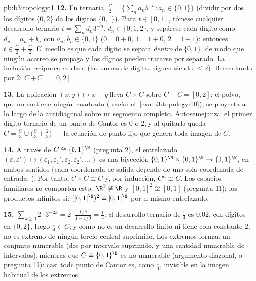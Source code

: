 \begin{solution}{pb:b3:topology:1}
\textbf{12.} En  ternaria, $\frac C2 = \{\sum_na_n3^{-n} : a_n
\in \{0, 1\}\}$ (dividir por dos los dígitos $\{0,2\}$ da los dígitos
$\{0,1\}$). Para $t \in [0,1]$, tómese cualquier desarrollo ternario
$t =
\sum_nd_n3^{-n}$, $d_n \in \{0,1,2\}$, y sepárese cada dígito como
$d_n = a_n + b_n$ con $a_n, b_n \in \{0,1\}$ ($0 = 0{+}0$, $1 = 1{+}0$,
$2 = 1{+}1$): entonces $t \in \frac C2 + \frac C2$. El meollo es que
cada dígito se separa \emph{dentro} de $\{0,1\}$, de modo que ningún
acarreo se propaga y los dígitos pueden tratarse por separado. La
inclusión recíproca es clara (las sumas de dígitos siguen siendo
$\leq 2$). Reescalando por $2$: $C + C = [0,2]$.

\textbf{13.} La aplicación $(x, y) \mapsto x + y$ lleva $C \times C$
sobre $C + C = [0,2]$: el polvo, que no contiene ningún cuadrado
( vacío:
el~\cref{exo:b3:topology:10}), se proyecta a lo largo de la antidiagonal
sobre un segmento completo. Autosemejanza: el primer dígito ternario de
un punto de Cantor es $0$ o $2$, y al quitarlo queda
$C = \frac C3 \cup \bigl(\frac C3 +
\frac23\bigr)$ --- la ecuación de punto fijo que genera toda imagen de
$C$.

\textbf{14.} A través de $C \cong \{0,1\}^\N$ (pregunta 2), el
entrelazado $(\varepsilon, \varepsilon') \mapsto
(\varepsilon_1, \varepsilon_1', \varepsilon_2,
\varepsilon_2', \dots)$ es una biyección
$\{0,1\}^\N\times\{0,1\}^\N \to \{0,1\}^\N$,
 en ambos sentidos (cada
coordenada de salida depende de una sola coordenada de entrada;
). Por tanto,
$C\times C \cong C$ y, por inducción, $C^n \cong C$. Los espacios
familiares no comparten esto: $\R^2 \not\cong \R$ y
$[0,1]^2 \not\cong [0,1]$ (pregunta 11); los productos infinitos sí:
$([0,1]^\N)^2 \cong
[0,1]^\N$ por el mismo entrelazado.

\textbf{15.} $\sum_{k\geq1}2\cdot3^{-2k} = 2\cdot\frac{1/9}{1
- 1/9} = \frac14$: el desarrollo ternario de $\frac14$ es
$0.\overline{02}$, con dígitos en $\{0,2\}$, luego $\frac14 \in
C$; y como no es un desarrollo finito ni tiene cola constante $2$, no es
extremo de ningún tercio central suprimido. Los extremos forman un
conjunto numerable (dos por intervalo suprimido, y una cantidad
numerable de intervalos), mientras que $C \cong \{0,1\}^\N$ es no
numerable (argumento diagonal, o pregunta 19): casi todo punto de Cantor
es, como $\frac14$, invisible en la imagen habitual de los extremos.


\end{solution}
